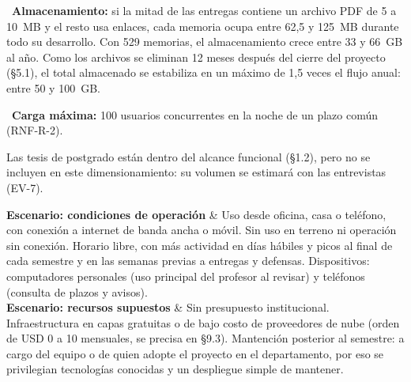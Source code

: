 \documentclass[10pt,a4paper]{article}
\newenvironment{kv}[1][4.6cm]
  {\footnotesize\setlength{\extrarowheight}{3pt}\xltabular{\linewidth}{|E{#1}|L|}\hline}
  {\endxltabular}
\newcommand{\kvrow}[2]{#1 & #2 \\ \hline}
\begin{document}
\begin{kv}[4.2cm]
{\textbullet~\textbf{Almacenamiento:} si la mitad de las entregas contiene un archivo PDF de 5 a 10~MB y el resto usa enlaces, cada memoria ocupa entre 62,5 y 125~MB durante todo su desarrollo. Con 529 memorias, el almacenamiento crece entre 33 y 66~GB al año. Como los archivos se eliminan 12 meses después del cierre del proyecto (§5.1), el total almacenado se estabiliza en un máximo de 1,5 veces el flujo anual: entre 50 y 100~GB.\par
\textbullet~\textbf{Carga máxima:} 100 usuarios concurrentes en la noche de un plazo común (RNF-R-2).\par
Las tesis de postgrado están dentro del alcance funcional (§1.2), pero no se incluyen en este dimensionamiento: su volumen se estimará con las entrevistas (EV-7).}
\kvrow{\textbf{Escenario: condiciones de operación}}{Uso desde oficina, casa o teléfono, con conexión a internet de banda ancha o móvil. Sin uso en terreno ni operación sin conexión. Horario libre, con más actividad en días hábiles y picos al final de cada semestre y en las semanas previas a entregas y defensas. Dispositivos: computadores personales (uso principal del profesor al revisar) y teléfonos (consulta de plazos y avisos).}
\kvrow{\textbf{Escenario: recursos supuestos}}{Sin presupuesto institucional. Infraestructura en capas gratuitas o de bajo costo de proveedores de nube (orden de USD 0 a 10 mensuales, se precisa en §9.3). Mantención posterior al semestre: a cargo del equipo o de quien adopte el proyecto en el departamento, por eso se privilegian tecnologías conocidas y un despliegue simple de mantener.}
\end{kv}
\end{document}
